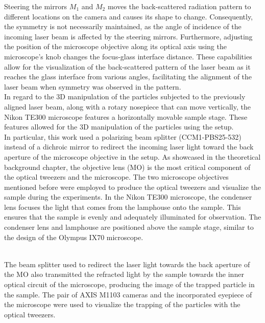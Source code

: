 \documentclass[letterpaper,12pt,oneside]{book}
\begin{document}
Steering the mirrors $M_1$ and $M_2$ moves the back-scattered radiation pattern to different locations on the camera and causes its shape to change. Consequently, the symmetry is not necessarily maintained, as the angle of incidence of the incoming laser beam is affected by the steering mirrors. Furthermore, adjusting the position of the microscope objective along its optical axis using the microscope's knob changes the focus-glass interface distance. These capabilities allow for the visualization of the back-scattered pattern of the laser beam as it reaches the glass interface from various angles, facilitating the alignment of the laser beam when symmetry was observed in the pattern.\\
In regard to the 3D manipulation of the particles subjected to the previously aligned laser beam, along with a rotary nosepiece that can move vertically, the Nikon TE300 microscope features a horizontally movable sample stage. These features allowed for the 3D manipulation of the particles using the setup. \\
In particular, this work used a polarizing beam splitter (CCM1-PBS25-532) instead of a dichroic mirror to redirect the incoming laser light toward the back aperture of the microscope objective in the setup.  
As showcased in the theoretical background chapter, the objective lens (MO) is the most critical component of the optical tweezers and the microscope. The two microscope objectives mentioned before were employed to produce the optical tweezers and visualize the sample during the experiments. %
In the Nikon TE300 microscope, the condenser lens focuses the light that comes from the lamphouse onto the sample. This ensures that the sample is evenly and adequately illuminated for observation. The condenser lens and lamphouse are positioned above the sample stage, similar to the design of the Olympus IX70 microscope.

\\ \noindent The beam splitter used to redirect the laser light towards the back aperture of the MO also transmitted the refracted light by the sample towards the inner optical circuit of the microscope, producing the image of the trapped particle in the sample. The pair of AXIS M1103 cameras and the incorporated eyepiece of the microscope were used to visualize the trapping of the particles with the optical tweezers. 
\end{document}

